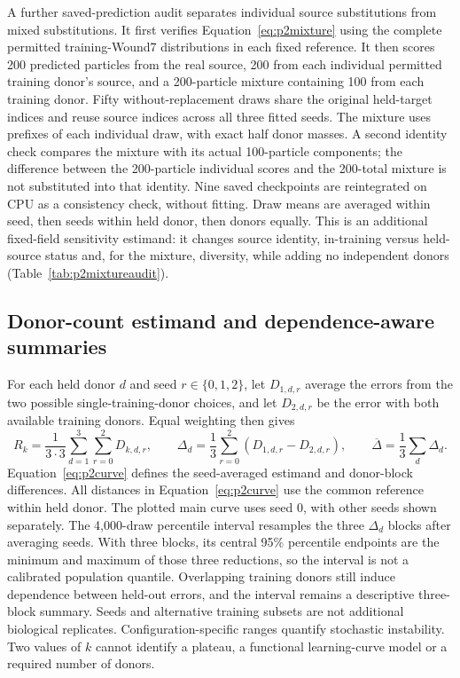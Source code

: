 A further saved-prediction audit separates individual source substitutions from mixed substitutions. It first verifies Equation~\eqref{eq:p2mixture} using the complete permitted training-Wound7 distributions in each fixed reference. It then scores 200 predicted particles from the real source, 200 from each individual permitted training donor's source, and a 200-particle mixture containing 100 from each training donor. Fifty without-replacement draws share the original held-target indices and reuse source indices across all three fitted seeds. The mixture uses prefixes of each individual draw, with exact half donor masses. A second identity check compares the mixture with its actual 100-particle components; the difference between the 200-particle individual scores and the 200-total mixture is not substituted into that identity. Nine saved checkpoints are reintegrated on CPU as a consistency check, without fitting. Draw means are averaged within seed, then seeds within held donor, then donors equally. This is an additional fixed-field sensitivity estimand: it changes source identity, in-training versus held-source status and, for the mixture, diversity, while adding no independent donors (Table~\ref{tab:p2mixtureaudit}).

\subsection{Donor-count estimand and dependence-aware summaries}
For each held donor $d$ and seed $r\in\{0,1,2\}$, let $D_{1,d,r}$ average the errors from the two possible single-training-donor choices, and let $D_{2,d,r}$ be the error with both available training donors. Equal weighting then gives
\begin{equation}
R_k=\frac1{3\cdot3}\sum_{d=1}^{3}\sum_{r=0}^{2}D_{k,d,r},\qquad
\Delta_d=\frac13\sum_{r=0}^{2}(D_{1,d,r}-D_{2,d,r}),\qquad
\overline\Delta=\frac13\sum_d\Delta_d.\label{eq:p2curve}
\end{equation}
Equation~\eqref{eq:p2curve} defines the seed-averaged estimand and donor-block differences. All distances in Equation~\eqref{eq:p2curve} use the common reference within held donor. The plotted main curve uses seed 0, with other seeds shown separately. The 4,000-draw percentile interval resamples the three $\Delta_d$ blocks after averaging seeds. With three blocks, its central 95\% percentile endpoints are the minimum and maximum of those three reductions, so the interval is not a calibrated population quantile. Overlapping training donors still induce dependence between held-out errors, and the interval remains a descriptive three-block summary. Seeds and alternative training subsets are not additional biological replicates. Configuration-specific ranges quantify stochastic instability. Two values of $k$ cannot identify a plateau, a functional learning-curve model or a required number of donors.


